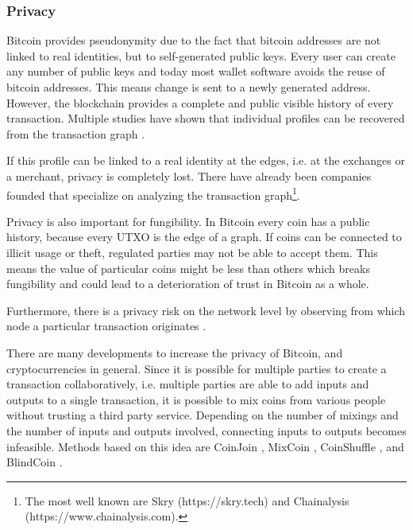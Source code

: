 \subsubsection{Privacy}

Bitcoin provides pseudonymity due to the fact that bitcoin addresses are not linked to real identities, but to self-generated public keys. Every user can create any number of public keys and today most wallet software avoids the reuse of bitcoin addresses. This means change is sent to a newly generated address. However, the blockchain provides a complete and public visible history of every transaction.  Multiple studies have shown that individual profiles can be recovered from the transaction graph \parencite{Ron2013,Androulaki2013,Reid2013,Babaioff:2012:BRB:2229012.2229022,fi5020237,Spagnuolo2014}.

If this profile can be linked to a real identity at the edges, i.e. at the exchanges or a merchant, privacy is completely lost. There have already been companies founded that specialize on analyzing the transaction graph\footnote{The most well known are Skry (https://skry.tech) and Chainalysis (https://www.chainalysis.com).}.

Privacy is also important for fungibility. In Bitcoin every coin has a public history, because every UTXO is the edge of a graph. If coins can be connected to illicit usage or theft, regulated parties may not be able to accept them. This means the value of particular coins might be less than others which breaks fungibility and could lead to a deterioration of trust in Bitcoin as a whole.

Furthermore, there is a privacy risk on the network level by observing from which node a particular transaction originates \parencite{Koshy2014,Biryukov:2014:DCB:2660267.2660379}.

There are many developments to increase the privacy of Bitcoin, and cryptocurrencies in general. Since it is possible for multiple parties to create a transaction collaboratively, i.e. multiple parties are able to add inputs and outputs to a single transaction, it is possible to mix coins from various people without trusting a third party service. Depending on the number of mixings and the number of inputs and outputs involved, connecting inputs to outputs becomes infeasible. Methods based on this idea are CoinJoin \parencite{maxwellcoinjoin,Meiklejohn2015}, MixCoin \parencite{Bonneau2014}, CoinShuffle \parencite{Ruffing2014}, and BlindCoin \parencite{Valenta2015}. 

